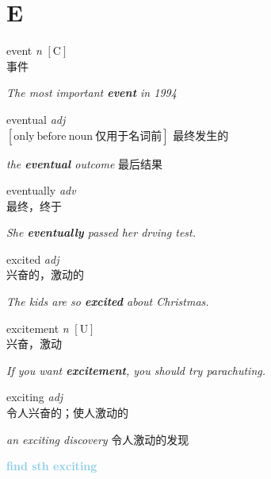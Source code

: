 \section{E}

\item[] {
    \lettrine{event}{}  
    \textit{n} 
    $\mathrm{[C]}$ 
    \\
    事件

    \textit{The most important \textbf{event} in 1994}

} 

\item[] {
    \lettrine{eventual}{}  
    \textit{adj} 
    \\
    $\mathrm{[ only \ before \ noun \ \mbox{仅用于名词前}]}$ 
    最终发生的

    \textit{the \textbf{eventual} outcome} 最后结果

} 

\item[] {
    \lettrine{eventually}{}  
    \textit{adv} 
    \\
    最终，终于

    \textit{She \textbf{eventually} passed her drving test.} 

} 

\item[] {
    \lettrine{excited}{}  
    \textit{adj} \\
    兴奋的，激动的

    \textit{The kids are so \textbf{excited} about Christmas.}

} 

\item[] {
    \lettrine{excitement}{}  
    \textit{n} 
    $\mathrm{[U]}$ \\
    兴奋，激动

    \textit{If you want \textbf{excitement}, you should try parachuting.}

} 

\item[] {
    \lettrine{exciting}{}  
    \textit{adj} \\
    令人兴奋的；使人激动的

    \textit{an exciting discovery} 令人激动的发现

    \textbf {
        \textcolor{SkyBlue} {
            find sth exciting
        }
    }

} 